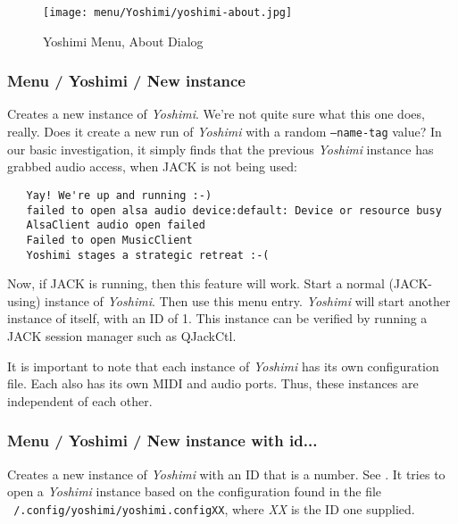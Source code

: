 \begin{figure}[H]
   \centering 
   \texttt{[image: menu/Yoshimi/yoshimi-about.jpg]}
   \caption{Yoshimi Menu, About Dialog}
   \label{fig:yoshimi_about_dialog}
\end{figure}

\subsubsection{Menu / Yoshimi / New instance}
\label{subsubsec:menu_yoshimi_new_instance}

   Creates a new instance of \textsl{Yoshimi}.
   We're not quite sure what this one does, really.
   Does it create a new run of 
   \textsl{Yoshimi}
   with a random \texttt{--name-tag} value?
   In our basic investigation, it simply finds that the previous
   \textsl{Yoshimi}
   instance has grabbed audio access, when JACK is not being used:

\begin{verbatim}
   Yay! We're up and running :-)
   failed to open alsa audio device:default: Device or resource busy
   AlsaClient audio open failed
   Failed to open MusicClient
   Yoshimi stages a strategic retreat :-(
\end{verbatim}

   Now, if JACK is running, then this feature will work.
   Start a normal (JACK-using) instance of \textsl{Yoshimi}.
   Then use this menu entry.  \textsl{Yoshimi} will start another instance
   of itself, with an ID of 1.
   This instance can be verified by running a JACK session manager such as
   QJackCtl.

   It is important to note that each instance of \textsl{Yoshimi} has its
   own configuration file.  Each also has its own MIDI and audio ports.
   Thus, these instances are independent of each other.

\subsubsection{Menu / Yoshimi / New instance with id...}
\label{subsubsec:menu_yoshimi_new_instance_with_id}

   Creates a new instance of \textsl{Yoshimi}
   with an ID that is a number.
   See .
   It tries to open a \textsl{Yoshimi} instance based on the configuration
   found in the file
   \texttt{~/.config/\-yoshimi/\-yoshimi.configXX}, where
   \textsl{XX} is the ID one supplied.

